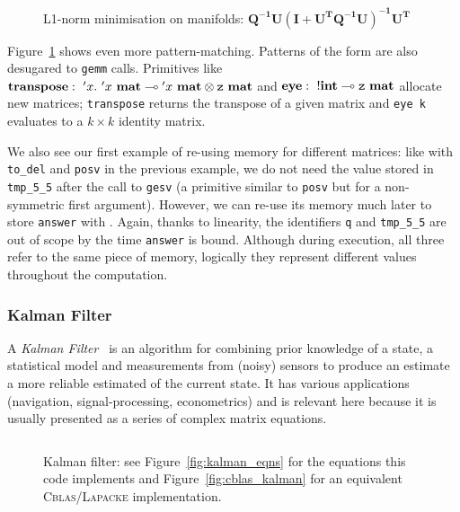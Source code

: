 \begin{figure}[t]
    \centering
    \inputminted[fontsize=\small]{ocaml}{../../examples/l1_norm_min.lt}
    \caption{L1-norm minimisation on manifolds:
        $\mathbf{Q^{-1}U(I+U^TQ^{-1}U)^{-1}U^T}$}\label{fig:lang_l1_norm_min}
\end{figure}

Figure~\ref{fig:lang_l1_norm_min} shows even more pattern-matching. Patterns of
the form  are also desugared
to \texttt{gemm} calls. Primitives like $\mathbf{transpose}:\ {'x}.\ {{'x}\ \mathbf{mat}}
\multimap {{'x}\ \mathbf{mat}} \otimes {\texttt{z}\ \mathbf{mat}}$ and $\mathbf{eye}:\ {!\mathbf{int}}
\multimap {\texttt{z}\ \mathbf{mat}}$ allocate new matrices; \texttt{transpose} returns
the transpose of a given matrix and \texttt{eye k} evaluates to a $k \times k$
identity matrix.

We also see our first example of re-using memory for different matrices: like
with \texttt{to\_del} and \texttt{posv} in the previous example, we do not need
the value stored in \texttt{tmp\_5\_5} after the call to \texttt{gesv} (a
primitive similar to \texttt{posv} but for a non-symmetric first argument).
However, we can re-use its memory much later to store \texttt{answer} with
. Again, thanks to
linearity, the identifiers \texttt{q} and \texttt{tmp\_5\_5} are out of scope
by the time \texttt{answer} is bound. Although during execution, all three
refer to the same piece of memory, logically they represent different values
throughout the computation.

\subsubsection{Kalman Filter}

A \emph{Kalman Filter}~\cite{kalman} is an algorithm for combining prior
knowledge of a state, a statistical model and measurements from (noisy) sensors
to produce an estimate a more reliable estimated of the current state.  It has
various applications (navigation, signal-processing, econometrics) and is
relevant here because it is usually presented as a series of complex matrix
equations.

\begin{figure}[t]
    \centering
    \inputminted[fontsize=\small]{ocaml}{../../examples/kalman.lt}
    \caption{Kalman filter: see Figure~\ref{fig:kalman_eqns} for the
        equations this code implements and Figure~\ref{fig:cblas_kalman}
        for an equivalent \textsc{Cblas/Lapacke} implementation.}\label{fig:lang_kalman}
\end{figure}

